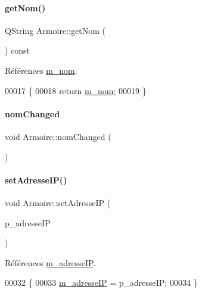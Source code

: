 \paragraph{\texorpdfstring{get\+Nom()}{getNom()}}
{\footnotesize\ttfamily Q\+String Armoire\+::get\+Nom (\begin{DoxyParamCaption}{ }\end{DoxyParamCaption}) const}



Références \hyperlink{class_armoire_a6d5fc6a37737b4822dc89191a79f6b7b}{m\+\_\+nom}.


\begin{DoxyCode}
00017 \{
00018     \textcolor{keywordflow}{return} \hyperlink{class_armoire_a6d5fc6a37737b4822dc89191a79f6b7b}{m\_nom};
00019 \}
\end{DoxyCode}
\mbox{\label{class_armoire_ade857388a0843a13530b463e44be9a72}} 
\paragraph{\texorpdfstring{nom\+Changed}{nomChanged}}
{\footnotesize\ttfamily void Armoire\+::nom\+Changed (\begin{DoxyParamCaption}{ }\end{DoxyParamCaption})\hspace{0.3cm}{\ttfamily [signal]}}

\mbox{\label{class_armoire_a0be45a8a0574139b955cc1f1b51a40d6}} 
\paragraph{\texorpdfstring{set\+Adresse\+I\+P()}{setAdresseIP()}}
{\footnotesize\ttfamily void Armoire\+::set\+Adresse\+IP (\begin{DoxyParamCaption}\item[{Q\+String}]{p\+\_\+adresse\+IP }\end{DoxyParamCaption})}



Références \hyperlink{class_armoire_ae92e8c48f53e69b871e7f70d9af19ffa}{m\+\_\+adresse\+IP}.


\begin{DoxyCode}
00032 \{
00033     \hyperlink{class_armoire_ae92e8c48f53e69b871e7f70d9af19ffa}{m\_adresseIP} = p\_adresseIP;
00034 \}
\end{DoxyCode}
\mbox{\label{class_armoire_a4b35e93cee5c78739ba543162e4dbfaa}} 
